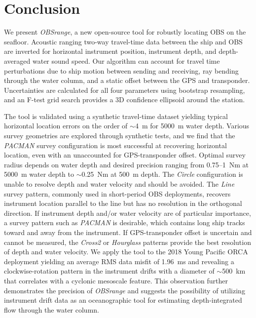 \documentclass[10pt,titlepage]{article}
\providecommand{\DIFaddbegin}{} %
\providecommand{\DIFaddend}{} %
\begin{document}
\section{Conclusion }
We present \textit{OBSrange}, a new open-source tool for robustly locating OBS on the seafloor. Acoustic ranging two-way travel-time data between the ship and OBS are inverted for horizontal instrument position, instrument depth, and depth-averaged water sound speed. Our algorithm can account for travel time perturbations due to ship motion between sending and receiving, ray bending through the water column, and a static offset between the GPS and transponder. Uncertainties are calculated for all four parameters using bootstrap resampling, and an F-test grid search provides a 3D confidence ellipsoid around the station. 
\DIFaddbegin 

\DIFaddend The tool is validated using a synthetic travel-time dataset yielding typical horizontal location errors on the order of $\sim$4~m for 5000~m water depth. Various survey geometries are explored through synthetic tests, and we find that the \textit{PACMAN} survey configuration is most successful at recovering horizontal location, even with an unaccounted for GPS-transponder offset. Optimal survey radius depends on water depth and desired precision ranging from 0.75--1~Nm at 5000~m water depth to $\sim$0.25~Nm at 500~m depth. The \textit{Circle} configuration is unable to resolve depth and water velocity and should be avoided. The \textit{Line} survey pattern, commonly used in short-period OBS deployments, recovers instrument location parallel to the line but has no resolution in the orthogonal direction. If instrument depth and/or water velocity are of particular importance, a survey pattern such as \textit{PACMAN} is desirable, which contains long ship tracks toward and away from the instrument. If GPS-transponder offset is uncertain and cannot be measured, the \textit{Cross2} or \textit{Hourglass} patterns provide the best resolution of depth and water velocity. We apply the tool to the 2018 Young Pacific ORCA deployment yielding an average RMS data misfit of 1.96~ms and revealing a clockwise-rotation pattern in the instrument drifts with a diameter of $\sim$500~km that correlates with a cyclonic mesoscale feature. This observation further demonstrates the precision of \textit{OBSrange} and suggests the possibility of utilizing instrument drift data as an oceanographic tool for estimating depth-integrated flow through the water column.
\end{document}
